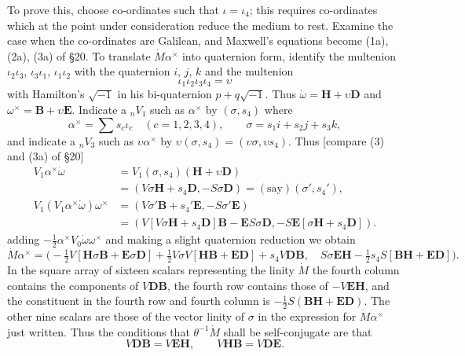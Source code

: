 \documentclass[11pt]{article}
\begin{document}
\indent To prove this, choose co-ordinates such that $\iota=\iota_4$; this requires co-ordinates which at the point under consideration reduce the medium to rest. Examine the case when the co-ordinates are Galilean, and Maxwell's equations become (1a), (2a), (3a) of §20. To translate $\dot M\alpha^\times$ into quaternion form, identify the multenion $\iota_2\iota_3$, $\iota_3\iota_1$, $\iota_1\iota_2$ with the quaternion $i$, $j$, $k$ and the multenion
\[
  \iota_1\iota_2\iota_3\iota_4=\upsilon
\]
with Hamilton's $\sqrt{-1}$ in his bi-quaternion $p+q\sqrt{-1}$. Thus $\dot\omega=\mathbf{H}+\upsilon\mathbf{D}$ and $\omega^\times=\mathbf{B}+\upsilon\mathbf{E}$. Indicate a ${}_nV_1$ such as $\alpha^\times$ by $(\sigma,s_4)$ where
\[
  \alpha^\times=\sum s_c\iota_c\quad(c=1,2,3,4),
  \qquad \sigma=s_1i+s_2j+s_3k,
\]
and indicate a ${}_nV_3$ such as $\upsilon\alpha^\times$ by $\upsilon(\sigma,s_4)=(\upsilon\sigma,\upsilon s_4)$. Thus [compare (3) and (3a) of §20]
\[
  \begin{aligned}
    V_1\alpha^\times\dot\omega
      &=V_1(\sigma,s_4)(\mathbf{H}+\upsilon\mathbf{D})\\
      &=(V\sigma\mathbf{H}+s_4\mathbf{D},-S\sigma\mathbf{D})=(\text{say})(\sigma',s_4'),\\
    V_1(V_1\alpha^\times\dot\omega)\omega^\times
      &=(V\sigma'\mathbf{B}+s_4'\mathbf{E},-S\sigma'\mathbf{E})\\
      &=(V[V\sigma\mathbf{H}+s_4\mathbf{D}]\mathbf{B}-\mathbf{E}S\sigma\mathbf{D},-S\mathbf{E}[\sigma\mathbf{H}+s_4\mathbf{D}]).
  \end{aligned}
\]
adding $-\tfrac12\alpha^\times V_0\dot\omega\omega^\times$ and making a slight quaternion reduction we obtain
\[
  \dot M\alpha^\times=\bigl(-\tfrac12V[\mathbf{H}\sigma\mathbf{B}+\mathbf{E}\sigma\mathbf{D}]+\tfrac12V\sigma V[\mathbf{H}\mathbf{B}+\mathbf{E}\mathbf{D}]+s_4V\mathbf{D}\mathbf{B},\quad S\sigma\mathbf{E}\mathbf{H}-\tfrac12s_4S[\mathbf{B}\mathbf{H}+\mathbf{E}\mathbf{D}]\bigr).
\]
\indent In the square array of sixteen scalars representing the linity $\dot M$ the fourth column contains the components of $V\mathbf{D}\mathbf{B}$, the fourth row contains those of $-V\mathbf{E}\mathbf{H}$, and the constituent in the fourth row and fourth column is $-\tfrac12S(\mathbf{B}\mathbf{H}+\mathbf{E}\mathbf{D})$. The other nine scalars are those of the vector linity of $\sigma$ in the expression for $\dot M\alpha^\times$ just written. Thus the conditions that $\theta^{-1}\dot M$ shall be self-conjugate are that
\[
  V\mathbf{D}\mathbf{B}=V\mathbf{E}\mathbf{H},\qquad V\mathbf{H}\mathbf{B}=V\mathbf{D}\mathbf{E}.
\]
\end{document}

